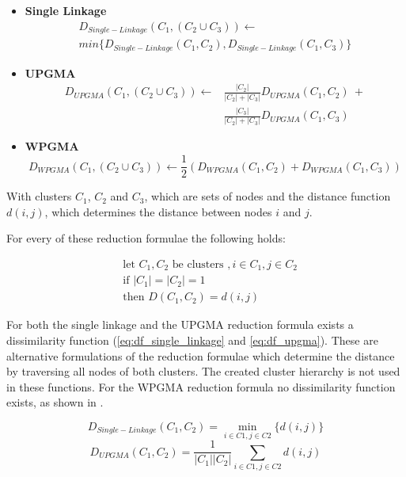 \documentclass[11pt, a4paper]{report}
\begin{document}
\begin{itemize}
    \item \textbf{Single Linkage}
    \begin{multline}
    D_{Single-Linkage}(C_1, (C_2 \cup C_3)) \leftarrow \\
    min \{ D_{Single-Linkage}(C_1, C_2), D_{Single-Linkage}(C_1, C_3) \}
    \end{multline}
    \item \textbf{UPGMA}
    \begin{equation}
    \begin{split}
    D_{UPGMA}(C_1, (C_2 \cup C_3)) \leftarrow &\frac{|C_2|}{|C_2|+|C_3|}D_{UPGMA}(C_1, C_2)\ + \\ &\frac{|C_3|}{|C_2|+|C_3|}D_{UPGMA}(C_1, C_3)
    \end{split}
    \end{equation}
    \item \textbf{WPGMA}
    \begin{equation}
    D_{WPGMA}(C_1, (C_2 \cup C_3)) \leftarrow \frac{1}{2} (D_{WPGMA}(C_1, C_2) + D_{WPGMA}(C_1, C_3))
    \end{equation}
\end{itemize}

With clusters $C_1$, $C_2$ and $C_3$, which are sets of nodes and the distance function $d(i, j)$, which determines the distance between nodes $i$ and $j$.

For every of these reduction formulae the following holds:

\begin{equation}
\begin{split}
&\textrm{let }C_1, C_2\textrm{ be clusters },i \in C_1, j \in C_2 \\
&\textrm{if }|C_1| = |C_2| = 1 \\
&\textrm{then }D(C_1, C_2) = d(i, j)
\end{split}
\end{equation}

For both the single linkage and the UPGMA reduction formula exists a dissimilarity function (\ref{eq:df_single_linkage} and \ref{eq:df_upgma}). These are alternative formulations of the reduction formulae which determine the distance by traversing all nodes of both clusters. The created cluster hierarchy is not used in these functions. For the WPGMA reduction formula no dissimilarity function exists, as shown in \cite{clustering:2007}.

\begin{equation} \label{eq:df_single_linkage}
D_{Single-Linkage}(C_1, C_2) = \min_{i\in{C1}, j\in{C2}}\{d(i, j)\}
\end{equation}
\begin{equation} \label{eq:df_upgma}
D_{UPGMA}(C_1, C_2) = \dfrac{1}{|C_1||C_2|} \sum_{i\in{C1}, j\in{C2}}{d(i, j)}
\end{equation}
\end{document}

